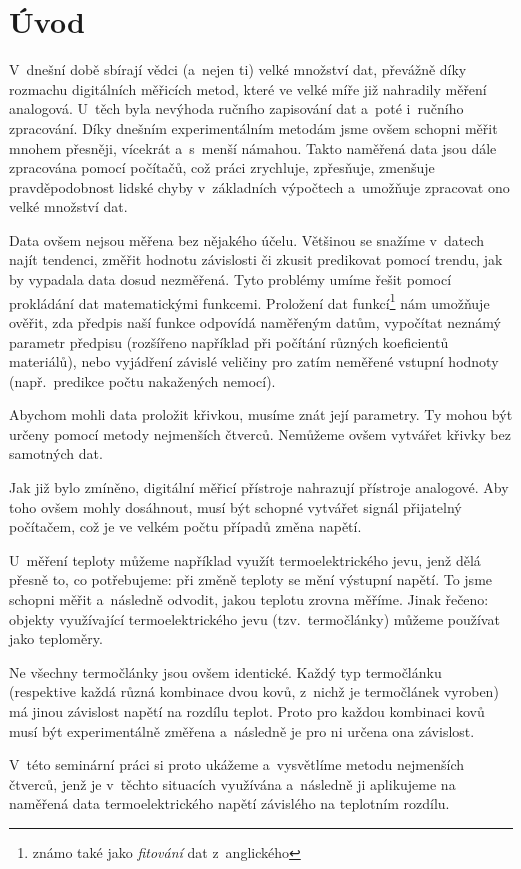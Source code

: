 \section{Úvod}
V~dnešní době sbírají vědci (a~nejen ti) velké množství dat, převážně díky
rozmachu digitálních měřicích metod, které ve velké míře již nahradily měření
analogová. U~těch byla nevýhoda ručního zapisování dat a~poté i~ručního
zpracování. Díky dnešním experimentálním metodám jsme ovšem schopni měřit
mnohem přesněji, vícekrát a~s~menší námahou. Takto naměřená data jsou dále
zpracována pomocí počítačů, což práci zrychluje, zpřesňuje, zmenšuje
pravděpodobnost lidské chyby v~základních výpočtech a~umožňuje zpracovat ono
velké množství dat.

Data ovšem nejsou měřena bez nějakého účelu. Většinou se snažíme v~datech najít
tendenci, změřit hodnotu závislosti či zkusit predikovat pomocí trendu,
jak by vypadala data dosud nezměřená. Tyto problémy umíme řešit pomocí
prokládání dat matematickými funkcemi. Proložení dat funkcí\footnote{známo také
jako \emph{fitování} dat z~anglického } nám umožňuje ověřit, zda
předpis naší funkce odpovídá naměřeným datům, vypočítat neznámý parametr
předpisu (rozšířeno například při počítání různých koeficientů materiálů), nebo
vyjádření závislé veličiny pro zatím neměřené vstupní hodnoty (např.~predikce
počtu nakažených nemocí).

Abychom mohli data proložit křivkou, musíme znát její parametry. Ty mohou být
určeny pomocí metody nejmenších čtverců. Nemůžeme ovšem vytvářet křivky bez
samotných dat.

Jak již bylo zmíněno, digitální měřicí přístroje nahrazují přístroje analogové.
Aby toho ovšem mohly dosáhnout, musí být schopné vytvářet signál přijatelný
počítačem, což je ve velkém počtu případů změna napětí. 

U~měření teploty můžeme například využít termoelektrického jevu, jenž dělá
přesně to, co potřebujeme: při změně teploty se mění výstupní napětí. To jsme
schopni měřit a~následně odvodit, jakou teplotu zrovna měříme. Jinak řečeno:
objekty využívající termoelektrického jevu (tzv.~termočlánky) můžeme používat
jako teploměry.

Ne všechny termočlánky jsou ovšem identické. Každý typ termočlánku (respektive
každá různá kombinace dvou kovů, z~nichž je termočlánek vyroben) má jinou
závislost napětí na rozdílu teplot. Proto pro každou kombinaci kovů musí být
experimentálně změřena a~následně je pro ni určena ona závislost.

V~této seminární práci si proto ukážeme a~vysvětlíme metodu nejmenších čtverců,
jenž je v~těchto situacích využívána a~následně ji aplikujeme na naměřená data
termoelektrického napětí závislého na teplotním rozdílu.
